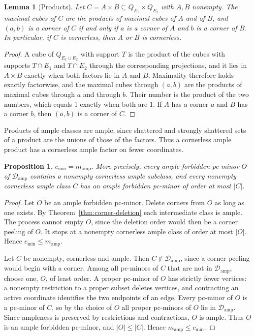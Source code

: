 \documentclass[11pt]{article}
\numberwithin{equation}{section}
\newtheorem{lemma}[theorem]{Lemma}
\newtheorem{proposition}[theorem]{Proposition}
\theoremstyle{definition}
\theoremstyle{remark}
\newcommand{\Damp}{\mathcal D_{\mathrm{amp}}}
\newcommand{\cmin}{c_{\min}}
\newcommand{\mamp}{m_{\mathrm{amp}}}
\begin{document}
\begin{lemma}[Products]
\label{lem:products}
Let \(C=A\times B\subseteq Q_{E_1}\times Q_{E_2}\) with \(A,B\) nonempty.  The
maximal cubes of \(C\) are the products of maximal cubes of \(A\) and of
\(B\), and \((a,b)\) is a corner of \(C\) if and only if \(a\) is a corner of
\(A\) and \(b\) is a corner of \(B\).  In particular, if \(C\) is cornerless,
then \(A\) or \(B\) is cornerless.
\end{lemma}

\begin{proof}
A cube of \(Q_{E_1\cup E_2}\) with support \(T\) is the product of the cubes
with supports \(T\cap E_1\) and \(T\cap E_2\) through the corresponding
projections, and it lies in \(A\times B\) exactly when both factors lie in
\(A\) and \(B\).  Maximality therefore holds exactly factorwise, and the
maximal cubes through \((a,b)\) are the products of maximal cubes through
\(a\) and through \(b\).  Their number is the product of the two numbers,
which equals \(1\) exactly when both are \(1\).  If \(A\) has a corner \(a\)
and \(B\) has a corner \(b\), then \((a,b)\) is a corner of \(C\).
\end{proof}

Products of ample classes are ample, since shattered and strongly shattered
sets of a product are the unions of those of the factors.  Thus a
cornerless ample product has a cornerless ample factor on fewer
coordinates.

\begin{proposition}
\label{prop:cmin-equals-mamp}
\(\cmin=\mamp\).  More precisely, every ample forbidden pc-minor \(O\) of
\(\Damp\) contains a nonempty cornerless ample subclass, and every nonempty
cornerless ample class \(C\) has an ample forbidden pc-minor of order at
most \(|C|\).
\end{proposition}

\begin{proof}
Let \(O\) be an ample forbidden pc-minor.  Delete corners from \(O\) as
long as one exists.  By Theorem~\ref{thm:corner-deletion} each
intermediate class is ample.  The process cannot empty \(O\), since the
deletion order would then be a corner peeling of \(O\).  It stops at a
nonempty cornerless ample class of order at most \(|O|\).  Hence
\(\cmin\le\mamp\).

Let \(C\) be nonempty, cornerless and ample.  Then \(C\notin\Damp\), since
a corner peeling would begin with a corner.  Among all pc-minors of \(C\)
that are not in \(\Damp\), choose one, \(O\), of least order.  A proper
pc-minor of \(O\) has strictly fewer vertices: a nonempty restriction to a
proper subset deletes vertices, and contracting an active coordinate
identifies the two endpoints of an edge.  Every pc-minor of \(O\) is a
pc-minor of \(C\), so by the choice of \(O\) all proper pc-minors of \(O\)
lie in \(\Damp\).  Since ampleness is preserved by restrictions and
contractions, \(O\) is ample.  Thus \(O\) is an ample forbidden pc-minor,
and \(|O|\le|C|\).  Hence \(\mamp\le\cmin\).
\end{proof}
\end{document}
